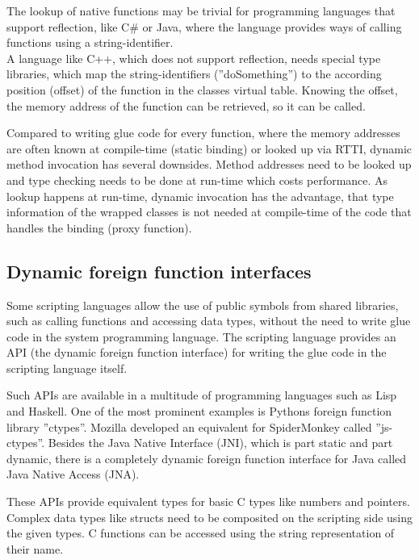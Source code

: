 The lookup of native functions may be trivial for programming languages that support reflection, like C\# or Java, where the language provides ways of calling functions using a string-identifier.\\
A language like C++, which does not support reflection, needs special type libraries, which map the string-identifiers (''doSomething'') to the according position (offset) of the function in the classes virtual table. Knowing the offset, the memory address of the function can be retrieved, so it can be called.

Compared to writing glue code for every function, where the memory addresses are often known at compile-time (static binding) or looked up via RTTI, dynamic method invocation has several downsides. Method addresses need to be looked up and type checking needs to be done at run-time which costs performance. As lookup happens at run-time, dynamic invocation has the advantage, that type information of the wrapped classes is not needed at compile-time of the code that handles the binding (proxy function).

\subsection{Dynamic foreign function interfaces}

Some scripting languages allow the use of public symbols from shared libraries, such as calling functions and accessing data types, without the need to write glue code in the system programming language. The scripting language provides an API (the dynamic foreign function interface) for writing the glue code in the scripting language itself.

Such APIs are available in a multitude of programming languages such as Lisp and Haskell. One of the most prominent examples is Pythons foreign function library ''ctypes''. Mozilla developed an equivalent for SpiderMonkey called ''js-ctypes''. Besides the Java Native Interface (JNI), which is part static and part dynamic, there is a completely dynamic foreign function interface for Java called Java Native Access (JNA). 

These APIs provide equivalent types for basic C types like numbers and pointers. Complex data types like structs need to be composited on the scripting side using the given types. C functions can be accessed using the string representation of their name.

